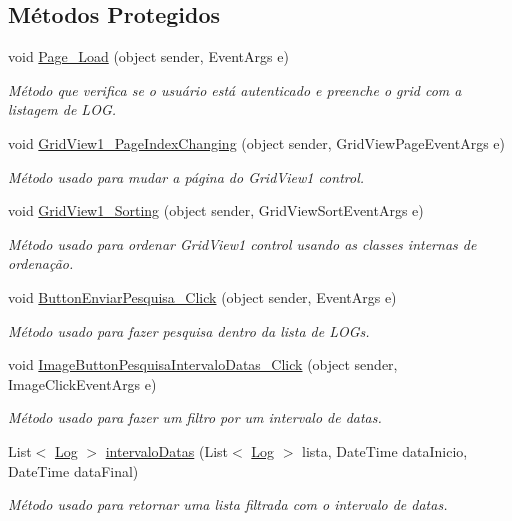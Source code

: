 \subsection*{Métodos Protegidos}
\begin{DoxyCompactItemize}
\item 
void \hyperlink{class_sistema_r_h_1_1_web_form_log_a934fa0ad608c8c1ad38b5fce4cb61e81}{Page\_\-Load} (object sender, EventArgs e)
\begin{DoxyCompactList}\small\item\em Método que verifica se o usuário está autenticado e preenche o grid com a listagem de LOG. \item\end{DoxyCompactList}\item 
void \hyperlink{class_sistema_r_h_1_1_web_form_log_aaa386223920ab688525b79911ab0ed88}{GridView1\_\-PageIndexChanging} (object sender, GridViewPageEventArgs e)
\begin{DoxyCompactList}\small\item\em Método usado para mudar a página do GridView1 control. \item\end{DoxyCompactList}\item 
void \hyperlink{class_sistema_r_h_1_1_web_form_log_add81d7c238ceb1cb7d016a0078661d53}{GridView1\_\-Sorting} (object sender, GridViewSortEventArgs e)
\begin{DoxyCompactList}\small\item\em Método usado para ordenar GridView1 control usando as classes internas de ordenação. \item\end{DoxyCompactList}\item 
void \hyperlink{class_sistema_r_h_1_1_web_form_log_a6596e8d034db786494cdbad33e3c463a}{ButtonEnviarPesquisa\_\-Click} (object sender, EventArgs e)
\begin{DoxyCompactList}\small\item\em Método usado para fazer pesquisa dentro da lista de LOGs. \item\end{DoxyCompactList}\item 
void \hyperlink{class_sistema_r_h_1_1_web_form_log_a97359d921062a8688707a40c342b5c60}{ImageButtonPesquisaIntervaloDatas\_\-Click} (object sender, ImageClickEventArgs e)
\begin{DoxyCompactList}\small\item\em Método usado para fazer um filtro por um intervalo de datas. \item\end{DoxyCompactList}\item 
List$<$ \hyperlink{class_sistema_r_h_1_1_log}{Log} $>$ \hyperlink{class_sistema_r_h_1_1_web_form_log_a14b0e74871b41a680f4fdfc63a704423}{intervaloDatas} (List$<$ \hyperlink{class_sistema_r_h_1_1_log}{Log} $>$ lista, DateTime dataInicio, DateTime dataFinal)
\begin{DoxyCompactList}\small\item\em Método usado para retornar uma lista filtrada com o intervalo de datas. \item\end{DoxyCompactList}\end{DoxyCompactItemize}

